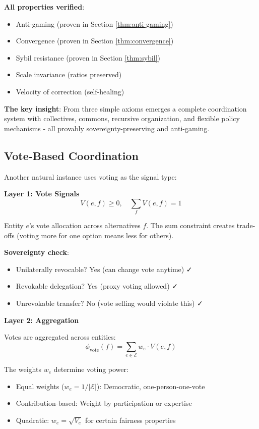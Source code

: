 \documentclass[11pt,a4paper]{article}
\theoremstyle{definition}
\theoremstyle{remark}
\newcommand{\E}{\mathcal{E}}
\begin{document}
\textbf{All properties verified}:
\begin{itemize}
\item Anti-gaming (proven in Section \ref{thm:anti-gaming})
\item Convergence (proven in Section \ref{thm:convergence})
\item Sybil resistance (proven in Section \ref{thm:sybil})
\item Scale invariance (ratios preserved)
\item Velocity of correction (self-healing)
\end{itemize}

\textbf{The key insight}: From three simple axioms emerges a complete coordination system with collectives, commons, recursive organization, and flexible policy mechanisms - all provably sovereignty-preserving and anti-gaming.

\subsection{Vote-Based Coordination}

Another natural instance uses voting as the signal type:

\textbf{Layer 1: Vote Signals}
\[ V(e,f) \ge 0, \quad \sum_f V(e,f) = 1 \]

Entity $e$'s vote allocation across alternatives $f$. The sum constraint creates trade-offs (voting more for one option means less for others).

\textbf{Sovereignty check}:
\begin{itemize}
\item Unilaterally revocable? Yes (can change vote anytime) ✓
\item Revokable delegation? Yes (proxy voting allowed) ✓
\item Unrevokable transfer? No (vote selling would violate this) ✓
\end{itemize}

\textbf{Layer 2: Aggregation}

Votes are aggregated across entities:
\[ \phi_{\text{vote}}(f) = \sum_{e \in \E} w_e \cdot V(e,f) \]

The weights $w_e$ determine voting power:
\begin{itemize}
\item Equal weights ($w_e = 1/|\E|$): Democratic, one-person-one-vote
\item Contribution-based: Weight by participation or expertise
\item Quadratic: $w_e = \sqrt{V_e}$ for certain fairness properties
\end{itemize}
\end{document}
